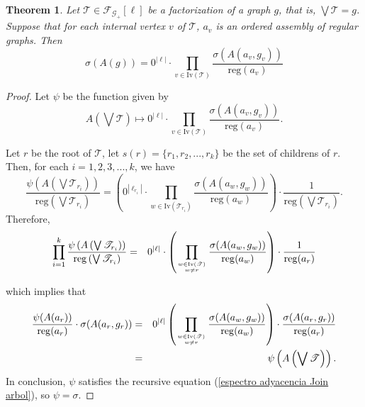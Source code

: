 \documentclass[10pt,a4paper]{amsart}
\newtheorem{theorem}{Theorem}
\begin{document}
\begin{theorem}\label{adjacency spectrum iterated}
Let $\mathscr{T}\in \mathscr{F}_{\mathscr{G}_+}[\ell]$ be a factorization of a graph $g$, that is, $\displaystyle{\bigvee \mathscr{T}=g}$. Suppose that for each internal vertex $v$ of $\mathscr{T}$, $a_v$ is an ordered assembly of regular graphs. Then
\begin{equation}\label{espectro adyacencia sobre un arbol enriquecido}
\sigma(A(g))=0^{|\ell|}\cdot \prod_{v\in \mathrm{Iv}(\mathscr{T})}\dfrac{\sigma(A(a_v,g_v))}{\mathrm{reg}(a_v)}
\end{equation}
\end{theorem}

\begin{proof}
Let $\psi$ be the function given by
\[A\left(\bigvee \mathscr{T}\right) \mapsto \displaystyle{0^{|\ell|}\cdot \prod_{v\in \mathrm{Iv}(\mathscr{T})}\dfrac{\sigma(A(a_v,g_v))}{\mathrm{reg}(a_v)}}.\]

Let $r$ be the root of $\mathscr{T}$, let $s(r)=\{r_1, r_2,...,r_k\}$ be the set of childrens of $r$. Then, for each $i=1,2,3,...,k$, we have
\begin{equation*}
\dfrac{\psi\left(A\left(\bigvee \mathscr{T}_{r_i}\right)\right)}{\mathrm{reg}\left(\bigvee \mathscr{T}_{r_i}\right)}=\left(0^{|\ell_{r_i}|}\cdot \prod_{w\in \mathrm{Iv}(\mathscr{T}_{r_i})}\dfrac{\sigma(A(a_w,g_w))}{\mathrm{reg}(a_w)}\right)\cdot \dfrac{1}{\mathrm{reg}\left(\bigvee \mathscr{T}_{r_i}\right)}.
\end{equation*}
Therefore,
\begin{eqnarray*}
\prod^k_{i=1} \dfrac{\psi\left(A\left(\bigvee \mathscr{T}_{r_i}\right)\right)}{\mathrm{reg}\left(\bigvee \mathscr{T}_{r_i}\right)}&=&0^{|\ell|}\cdot \left(\prod_{w\in \mathrm{Iv}(\mathscr{T}) \atop w\neq r} \dfrac{\sigma(A(a_w,g_w))}{\mathrm{reg}(a_w)}\right)\cdot \dfrac{1}{\mathrm{reg}(a_r)}
\end{eqnarray*}

which implies that
\begin{eqnarray*}
\dfrac{\psi(A(a_r))}{\mathrm{reg}(a_r)}\cdot \sigma(A(a_r, g_r))&=&0^{|\ell|}\left(\prod_{w\in \mathrm{Iv}(\mathscr{T})\atop w\neq r} \dfrac{\sigma(A(a_w,g_w))}{\mathrm{reg}(a_w)}\right)\cdot \dfrac{\sigma(A(a_r,g_r))}{\mathrm{reg}(a_r)}\\
&=&\psi\left(A\left(\bigvee \mathscr{T}\right)\right).
\end{eqnarray*}
In conclusion, $\psi$ satisfies the recursive equation (\ref{espectro adyacencia Join arbol}), so $\psi=\sigma$.
\end{proof}
\end{document}
